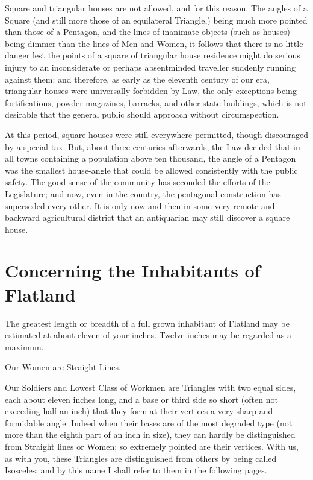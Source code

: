 \documentclass[12pt, a4paper, oneside]{memoir}
\begin{document}
Square and triangular houses are not allowed, and for this reason. The angles
of a Square (and still more those of an equilateral Triangle,) being much more
pointed than those of a Pentagon, and the lines of inanimate objects (such as
houses) being dimmer than the lines of Men and Women, it follows that there is
no little danger lest the points of a square of triangular house residence
might do serious injury to an inconsiderate or perhaps absentminded traveller
suddenly running against them: and therefore, as early as the eleventh century
of our era, triangular houses were universally forbidden by Law, the only
exceptions being fortifications, powder-magazines, barracks, and other state
buildings, which is not desirable that the general public should approach
without circumspection.

At this period, square houses were still everywhere permitted, though
discouraged by a special tax. But, about three centuries afterwards, the Law
decided that in all towns containing a population above ten thousand, the
angle of a Pentagon was the smallest house-angle that could be allowed
consistently with the public safety. The good sense of the community has
seconded the efforts of the Legislature; and now, even in the country, the
pentagonal construction has superseded every other. It is only now and then in
some very remote and backward agricultural district that an antiquarian may
still discover a square house.













\chapter{Concerning the Inhabitants of Flatland}
The greatest length or breadth of a full grown inhabitant of Flatland may be
estimated at about eleven of your inches. Twelve inches may be regarded as a
maximum.

Our Women are Straight Lines.

Our Soldiers and Lowest Class of Workmen are Triangles with two equal sides,
each about eleven inches long, and a base or third side so short (often not
exceeding half an inch) that they form at their vertices a very sharp and
formidable angle. Indeed when their bases are of the most degraded type (not
more than the eighth part of an inch in size), they can hardly be
distinguished from Straight lines or Women; so extremely pointed are their
vertices. With us, as with you, these Triangles are distinguished from others
by being called Isosceles; and by this name I shall refer to them in the
following pages.
\end{document}
